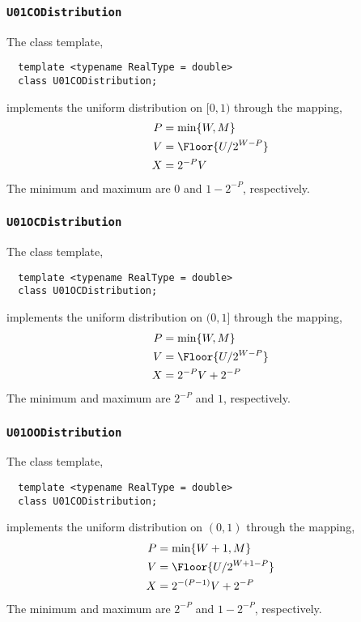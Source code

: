 \subsubsection{\texttt{U01CODistribution}}

The class template,
\begin{Verbatim}
  template <typename RealType = double>
  class U01CODistribution;
\end{Verbatim}
implements the uniform distribution on $[0, 1)$ through the mapping,
\begin{align*}
  P &= \min\{W, M\} \\
  V &= \Floor{U / 2^{W - P}} \\
  X &= 2^{-P} V
\end{align*}
The minimum and maximum are $0$ and $1 - 2^{-P}$, respectively.

\subsubsection{\texttt{U01OCDistribution}}

The class template,
\begin{Verbatim}
  template <typename RealType = double>
  class U01OCDistribution;
\end{Verbatim}
implements the uniform distribution on $(0, 1]$ through the mapping,
\begin{align*}
  P &= \min\{W, M\} \\
  V &= \Floor{U / 2^{W - P}} \\
  X &= 2^{-P} V + 2^{-P}
\end{align*}
The minimum and maximum are $2^{-P}$ and $1$, respectively.

\subsubsection{\texttt{U01OODistribution}}

The class template,
\begin{Verbatim}
  template <typename RealType = double>
  class U01CODistribution;
\end{Verbatim}
implements the uniform distribution on $(0, 1)$ through the mapping,
\begin{align*}
  P &= \min\{W + 1, M\} \\
  V &= \Floor{U / 2^{W + 1 - P}} \\
  X &= 2^{-(P - 1)} V + 2^{-P}
\end{align*}
The minimum and maximum are $2^{-P}$ and $1 - 2^{-P}$, respectively.


